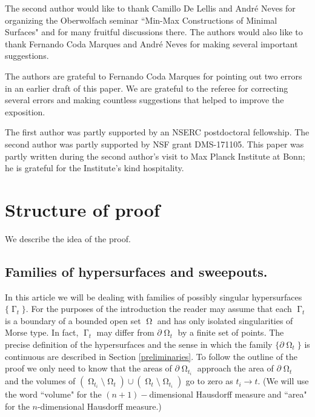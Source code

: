 \documentclass[12pt]{amsart}
\DeclareMathOperator{\G}{\Gamma}
\DeclareMathOperator{\Om}{\Omega}
\theoremstyle{definition}
\begin{document}
The second author would like to thank Camillo De Lellis and
Andr\'{e} Neves for organizing the Oberwolfach seminar ``Min-Max
Constructions of Minimal Surfaces" and for many fruitful
discussions there.
The authors would also like to thank Fernando Coda Marques and Andr\'{e} Neves for making several important suggestions.


The authors are grateful to Fernando Coda Marques
for pointing out two errors in an earlier 
draft of this paper. We are grateful to the referee for 
correcting several errors and making countless suggestions
that helped to improve the exposition.

The first author was partly supported by an NSERC postdoctoral fellowship.
The second author was partly supported by NSF grant DMS-171105.
This paper was partly written during the second
author's visit to Max Planck Institute at Bonn;
he is grateful for the Institute's kind
hospitality.


\section{Structure of proof} \label{sec:structure}

We describe the idea of the proof.  

\subsection{Families of hypersurfaces and sweepouts.}
In this article we will be dealing with families 
of possibly singular hypersurfaces $\{ \G_t \}$.
For the purposes of the introduction
the reader may assume that each $\G_t$
is a boundary of a bounded open set $\Om$
and has only isolated singularities of Morse type.
In fact, $\G_t$ may differ from $\partial \Om_t$ by a finite set of points.
The precise definition of the hypersurfaces
and the sense in which the family $\{ \partial \Om_t \}$
is continuous are described in Section \ref*{preliminaries}.
To follow the outline of the proof we only
need to know that the areas of $\partial \Om_{t_i}$
approach the area of $\partial \Om_{t}$
 and the volumes
of $(\Om_{t_i} \setminus \Om_{t}) \cup (\Om_{t} \setminus \Om_{t_i})$ 
go to zero as $t_i \rightarrow t$.
(We will use the word ``volume" for the $(n+1)-$dimensional 
Hausdorff measure and ``area" for the $n$-dimensional Hausdorff measure.)
\end{document}
